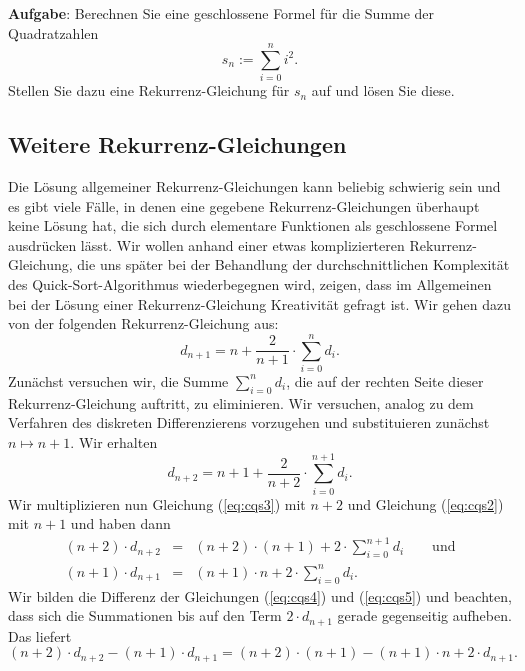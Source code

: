 \noindent
\textbf{Aufgabe}:
Berechnen Sie eine geschlossene Formel f\"ur die Summe
der Quadratzahlen
\[ s_n := \sum\limits_{i=0}^{n} i^2. \]
Stellen Sie dazu eine Rekurrenz-Gleichung f\"ur $s_n$ auf und l\"osen Sie diese.

\subsection{Weitere Rekurrenz-Gleichungen}
Die L\"osung allgemeiner Rekurrenz-Gleichungen kann beliebig schwierig sein und
es gibt viele F\"alle, in denen eine gegebene Rekurrenz-Gleichungen \"uberhaupt keine L\"osung
hat, die sich durch elementare Funktionen als geschlossene Formel ausdr\"ucken l\"asst.
Wir wollen anhand einer etwas komplizierteren Rekurrenz-Gleichung, die uns sp\"ater bei der Behandlung der
durchschnittlichen Komplexit\"at des Quick-Sort-Algorithmus wiederbegegnen wird, zeigen, dass im Allgemeinen bei
der L\"osung einer Rekurrenz-Gleichung Kreativit\"at gefragt ist.
Wir gehen dazu von der folgenden  Rekurrenz-Gleichung aus:
\begin{equation}
  \label{eq:cqs2}
  d_{n+1} = n + \frac{2}{n+1} \cdot \sum_{i=0}^n d_i.   
\end{equation}
Zun\"achst versuchen wir, die Summe $\sum_{i=0}^n d_i$, die auf der rechten Seite dieser Rekurrenz-Gleichung
auftritt, zu eliminieren.  Wir versuchen, analog zu dem Verfahren des diskreten Differenzierens vorzugehen
und substituieren zun\"achst $n \mapsto n+1$.  Wir erhalten 
\begin{equation}
  \label{eq:cqs3}
   d_{n+2} = n+1 + \frac{2}{n+2} \cdot \sum_{i=0}^{n+1} d_i.  
\end{equation}
Wir multiplizieren nun Gleichung (\ref{eq:cqs3}) mit $n+2$ und Gleichung (\ref{eq:cqs2}) mit $n+1$ und
haben dann
\begin{eqnarray}
  \label{eq:cqs4}
 (n+2)\cdot d_{n+2} & = & (n+2)\cdot(n+1) + 2 \cdot \sum_{i=0}^{n+1} d_i \qquad \mbox{und} \\
  \label{eq:cqs5}
 (n+1)\cdot d_{n+1} & = & (n+1)\cdot n + 2 \cdot \sum_{i=0}^n d_i.  
\end{eqnarray}
Wir bilden die Differenz der Gleichungen (\ref{eq:cqs4}) und (\ref{eq:cqs5}) und beachten,
dass sich die Summationen bis auf den Term $2\cdot d_{n+1}$ gerade gegenseitig aufheben.
Das liefert
\begin{equation}
  \label{eq:cqs6}
 (n+2)\cdot d_{n+2} - (n+1)\cdot \displaystyle d_{n+1} = (n+2)\cdot(n+1) - (n+1)\cdot n+2 \cdot d_{n+1}.
\end{equation}
